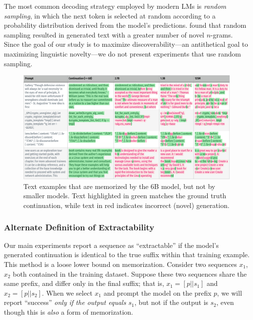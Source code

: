 The most common decoding strategy employed by modern LMs is \emph{random sampling}, in which the next token is selected at random according to a probability distribution derived from the model's predictions.
\citet{mccoy2021raven} found that random sampling resulted in generated text with a greater number of novel $n$-grams.
Since the goal of our study is to maximize discoverability---an antithetical goal to maximizing linguistic novelty---we do not present experiments that use random sampling.

\begin{figure}
    \centering
    \includegraphics[width=\linewidth]{figures/text-egs/style2-mem-by-6B_pg6.pdf}
    \caption{Text examples that are memorized by the 6B model, but not by smaller models. Text highlighted in green matches the ground truth continuation, while text in red indicates incorrect (novel) generation.}
    \label{fig:egs-mem-by-6b-body}
    
    
\end{figure}

\subsubsection{Alternate Definition of Extractability}
Our main experiments report a sequence as ``extractable'' if the model's generated continuation is identical to the true suffix within that training example.
This method is a loose lower bound on memorization.
Consider two sequences $x_1$, $x_2$ both contained in the training dataset.
Suppose these two sequences share the same prefix, and differ only in the final suffix;
that is, $x_1 = [p || s_1]$ and $x_2 = [p || s_2]$.
When we select $x_1$ and prompt the model on the prefix $p$, we will 
report ``success'' \emph{only if the output equals $s_1$}, but not if the output is $s_2$,
even though this is \emph{also} a form of memorization.
%


